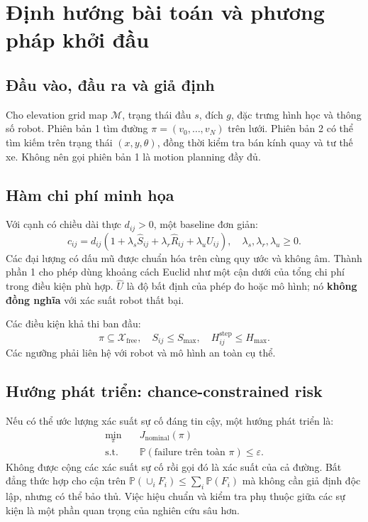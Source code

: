 \documentclass[11pt,a4paper]{article}
\begin{document}
\section{Định hướng bài toán và phương pháp khởi đầu}
\subsection{Đầu vào, đầu ra và giả định}
Cho elevation grid map \(\mathcal{M}\), trạng thái đầu \(s\),
đích \(g\), đặc trưng hình học và thông số robot.
Phiên bản 1 tìm đường \(\pi=(v_0,\ldots,v_N)\) trên lưới.
Phiên bản 2 có thể tìm kiếm trên trạng thái
\((x,y,\theta)\), đồng thời kiểm tra bán kính quay và tư thế xe.
Không nên gọi phiên bản 1 là motion planning đầy đủ.

\subsection{Hàm chi phí minh họa}
Với cạnh có chiều dài thực \(d_{ij}>0\), một baseline đơn giản:
\begin{equation}
 c_{ij}=d_{ij}\left(
 1+\lambda_s \widehat S_{ij}
  +\lambda_r \widehat R_{ij}
  +\lambda_u \widehat U_{ij}\right),
 \quad \lambda_s,\lambda_r,\lambda_u\geq 0.
 \label{eq:cost}
\end{equation}
Các đại lượng có dấu mũ được chuẩn hóa trên cùng quy ước
và không âm. Thành phần 1 cho phép dùng khoảng cách Euclid
như một cận dưới của tổng chi phí trong điều kiện phù hợp.
\(\widehat U\) là độ bất định của phép đo hoặc mô hình;
nó \textbf{không đồng nghĩa} với xác suất robot thất bại.

Các điều kiện khả thi ban đầu:
\begin{equation}
 \pi\subseteq\mathcal X_{\mathrm{free}},\quad
 S_{ij}\leq S_{\max},\quad
 H^{\mathrm{step}}_{ij}\leq H_{\max}.
\end{equation}
Các ngưỡng phải liên hệ với robot và mô hình an toàn cụ thể.

\subsection{Hướng phát triển: chance-constrained risk}
Nếu có thể ước lượng xác suất sự cố đáng tin cậy,
một hướng phát triển là:
\begin{equation}
 \begin{aligned}
 \min_\pi\quad &J_{\mathrm{nominal}}(\pi)\\
 \mathrm{s.t.}\quad &
 \mathbb{P}(\text{failure trên toàn }\pi)\leq\varepsilon.
 \end{aligned}
 \label{eq:chance}
\end{equation}
Không được cộng các xác suất sự cố rồi gọi đó là xác suất
của cả đường. Bất đẳng thức hợp cho cận trên
\(\mathbb{P}(\cup_i F_i)\leq\sum_i\mathbb{P}(F_i)\)
mà không cần giả định độc lập, nhưng có thể bảo thủ.
Việc hiệu chuẩn và kiểm tra phụ thuộc giữa các sự kiện là
một phần quan trọng của nghiên cứu sâu hơn.
\end{document}
